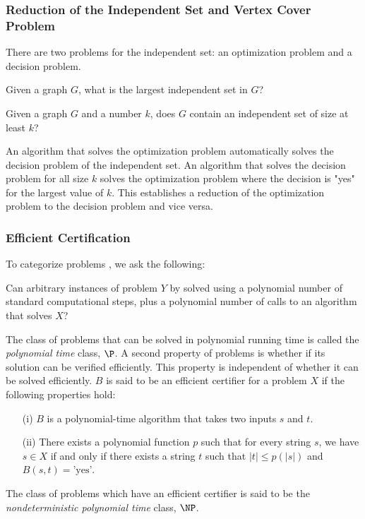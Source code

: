 \subsubsection{Reduction of the Independent Set and Vertex Cover Problem}
There are two problems for the independent set: an optimization problem and a decision problem.
\begin{prob}
Given a graph $G$, what is the largest independent set in $G$?
\end{prob}
\begin{prob}
Given a graph $G$ and a number $k$, does $G$ contain an independent set of size at least $k$?
\end{prob}
An algorithm that solves the optimization problem automatically solves the decision problem of the independent set.  An algorithm that solves the decision problem for all size $k$ solves the optimization problem where the decision is "yes" for the largest value of $k$.  This establishes a reduction of the optimization problem to the decision problem and vice versa. 
\subsubsection{Efficient Certification}

To categorize problems \cite{kleinberg2006algorithm}, we ask the following:
\begin{prob}
Can arbitrary instances of problem $Y$ by solved using a polynomial number of standard computational steps, plus a polynomial number of calls to an algorithm that solves $X$?
\end{prob}
The class of problems that can be solved in polynomial running time is called the \textit{polynomial time} class, $\P$.  A second property of problems is whether if its solution can be verified efficiently.  This property is independent of whether it can be solved efficiently.  $B$ is said to be an efficient certifier for a problem $X$  if the following properties hold:
\begin{itemize}
\item[(i)] $B$ is a polynomial-time algorithm that takes two inputs $s$ and $t$.
\item[(ii)] There exists a polynomial function $p$ such that for every string $s$, we have $s \in X$ if and only if there exists a string $t$ such that $\vert t \vert \leq p\left( \vert s \vert \right)$ and $B(s,t) = \text{'yes'}$.
\end{itemize}

The class of problems which have an efficient certifier is said to be the \textit{nondeterministic polynomial time} class, $\NP$.
